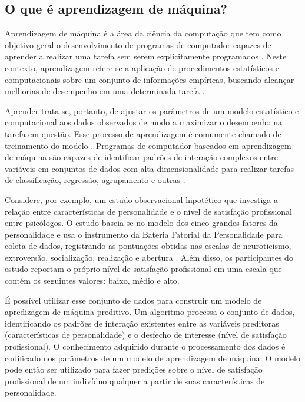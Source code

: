 \subsection{O que é aprendizagem de máquina?}

Aprendizagem de máquina é a área da ciência da computação que tem como objetivo geral o desenvolvimento de programas
de computador capazes de aprender a realizar uma tarefa sem serem explicitamente programados \cite{Bi2019, Theobald2021}.
Neste contexto, aprendizagem refere-se a aplicação de procedimentos estatísticos e computacionais sobre um conjunto
de informações empíricas, buscando alcançar melhorias de desempenho em uma determinada tarefa \cite{Theobald2021}.

Aprender trata-se, portanto, de ajustar os parâmetros de um modelo estatístico e computacional aos dados observados
de modo a maximizar o desempenho na tarefa em questão. Esse processo de aprendizagem é comumente chamado de treinamento
do modelo \cite{Bi2019}. Programas de computador baseados em aprendizagem de máquina são capazes de identificar padrões
de interação complexos entre variáveis em conjuntos de dados com alta dimensionalidade para realizar tarefas de classificação,
regressão, agrupamento e outras \cite{Theobald2021}.

Considere, por exemplo, um estudo observacional hipotético que investiga a relação entre características de personalidade
e o nível de satisfação profissional entre psicólogos. O estudo baseia-se no modelo dos cinco grandes fatores da personalidade
\cite{Hutz2018} e usa o instrumento da Bateria Fatorial da Personalidade para coleta de dados, registrando as pontuações obtidas
nas escalas de neuroticismo, extroversão, socialização, realização e abertura \cite{Sancineto2015}. Além disso, os participantes
do estudo reportam o próprio nível de satisfação profissional em uma escala que contém os seguintes valores: baixo, médio e alto.

É possível utilizar esse conjunto de dados para construir um modelo de apredizagem de máquina preditivo. Um algoritmo processa o conjunto de dados,
identificando os padrões de interação existentes entre as variáveis preditoras (características de personalidade) e o desfecho de interesse (nível
de satisfação profissional). O conhecimento adquirido durante o processamento dos dados é codificado nos parâmetros de um modelo de aprendizagem de
máquina. O modelo pode então ser utilizado para fazer predições sobre o nível de satisfação profissional de um indivíduo qualquer a partir de suas
características de personalidade.

